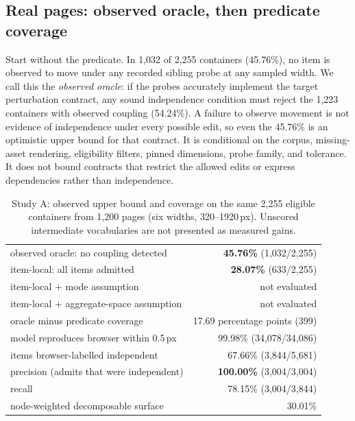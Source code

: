 \documentclass[acmsmall,screen,review,anonymous,nonacm]{acmart}
\begin{document}
\subsection{Real pages: observed oracle, then predicate coverage}
Start without the predicate. In 1{,}032 of 2{,}255 containers (45.76\%), no item is observed to move under any recorded sibling probe at any sampled width. We call this the \emph{observed oracle}: if the probes accurately implement the target perturbation contract, any sound independence condition must reject the 1{,}223 containers with observed coupling (54.24\%). A failure to observe movement is not evidence of independence under every possible edit, so even the 45.76\% is an optimistic upper bound for that contract. It is conditional on the corpus, missing-asset rendering, eligibility filters, pinned dimensions, probe family, and tolerance. It does not bound contracts that restrict the allowed edits or express dependencies rather than independence.

\begin{table}[t]
\centering\footnotesize
\caption{Study A: observed upper bound and coverage on the same 2{,}255 eligible containers from 1{,}200 pages (six widths, 320--1920\,px). Unscored intermediate vocabularies are not presented as measured gains.}
\label{tab:studyA}
\begin{tabular}{lr}
\toprule
observed oracle: no coupling detected & \textbf{45.76\%} (1{,}032/2{,}255) \\
item-local: all items admitted & \textbf{28.07\%} (633/2{,}255) \\
item-local + mode assumption & not evaluated \\
item-local + aggregate-space assumption & not evaluated \\
oracle minus predicate coverage & 17.69 percentage points (399) \\
\midrule
model reproduces browser within 0.5\,px & 99.98\% (34{,}078/34{,}086) \\
items browser-labelled independent & 67.66\% (3{,}844/5{,}681) \\
precision (admits that were independent) & \textbf{100.00\%} (3{,}004/3{,}004) \\
recall & 78.15\% (3{,}004/3{,}844) \\
node-weighted decomposable surface & 30.01\% \\
\bottomrule
\end{tabular}
\end{table}
\end{document}
